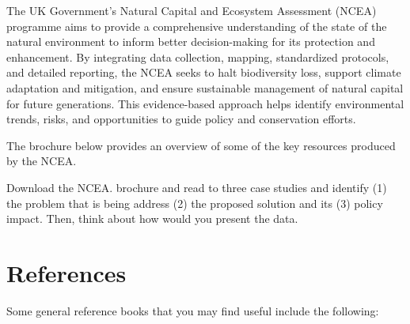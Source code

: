 \documentclass[
  letterpaper,
  DIV=11,
  numbers=noendperiod]{scrartcl}
\begin{document}
\begin{tcolorbox}[enhanced jigsaw, breakable, bottomrule=.15mm, toprule=.15mm, colbacktitle=quarto-callout-note-color!10!white, bottomtitle=1mm, arc=.35mm, opacitybacktitle=0.6, titlerule=0mm, colframe=quarto-callout-note-color-frame, toptitle=1mm, title={Example of Natural Capital and Ecosystem Assessment (NCEA) programme}, rightrule=.15mm, leftrule=.75mm, left=2mm, colback=white, opacityback=0, coltitle=black]

The UK Government's Natural Capital and Ecosystem Assessment (NCEA)
programme aims to provide a comprehensive understanding of the state of
the natural environment to inform better decision-making for its
protection and enhancement. By integrating data collection, mapping,
standardized protocols, and detailed reporting, the NCEA seeks to halt
biodiversity loss, support climate adaptation and mitigation, and ensure
sustainable management of natural capital for future generations. This
evidence-based approach helps identify environmental trends, risks, and
opportunities to guide policy and conservation efforts.

The brochure below provides an overview of some of the key resources
produced by the NCEA.

\end{tcolorbox}

\begin{tcolorbox}[enhanced jigsaw, breakable, bottomrule=.15mm, toprule=.15mm, colbacktitle=quarto-callout-tip-color!10!white, bottomtitle=1mm, arc=.35mm, opacitybacktitle=0.6, titlerule=0mm, colframe=quarto-callout-tip-color-frame, toptitle=1mm, title={Exercise 6}, rightrule=.15mm, leftrule=.75mm, left=2mm, colback=white, opacityback=0, coltitle=black]

Download the NCEA. brochure and read to three case studies and identify
(1) the problem that is being address (2) the proposed solution and its
(3) policy impact. Then, think about how would you present the data.

\end{tcolorbox}

\section*{References}\label{references}

Some general reference books that you may find useful include the
following:
\end{document}

